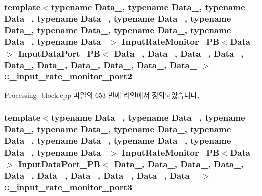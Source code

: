 \subsubsection[{\texorpdfstring{\+\_\+input\+\_\+rate\+\_\+monitor\+\_\+port2}{_input_rate_monitor_port2}}]{\setlength{\rightskip}{0pt plus 5cm}template$<$typename Data\+\_, typename Data\+\_, typename Data\+\_, typename Data\+\_, typename Data\+\_, typename Data\+\_, typename Data\+\_, typename Data\+\_, typename Data\+\_, typename Data\+\_$>$ {\bf Input\+Rate\+Monitor\+\_\+\+PB}$<$Data\+\_$>$ {\bf Input\+Data\+Port\+\_\+\+PB}$<$ Data\+\_, Data\+\_, Data\+\_, Data\+\_, Data\+\_, Data\+\_, Data\+\_, Data\+\_, Data\+\_, Data\+\_ $>$\+::\+\_\+input\+\_\+rate\+\_\+monitor\+\_\+port2\hspace{0.3cm}{\ttfamily [private]}}\hypertarget{classInputDataPort__PB_a9e3ee67f17eac2124e134f683292dfc5}{}\label{classInputDataPort__PB_a9e3ee67f17eac2124e134f683292dfc5}


Processing\+\_\+block.\+cpp 파일의 653 번째 라인에서 정의되었습니다.

\subsubsection[{\texorpdfstring{\+\_\+input\+\_\+rate\+\_\+monitor\+\_\+port3}{_input_rate_monitor_port3}}]{\setlength{\rightskip}{0pt plus 5cm}template$<$typename Data\+\_, typename Data\+\_, typename Data\+\_, typename Data\+\_, typename Data\+\_, typename Data\+\_, typename Data\+\_, typename Data\+\_, typename Data\+\_, typename Data\+\_$>$ {\bf Input\+Rate\+Monitor\+\_\+\+PB}$<$Data\+\_$>$ {\bf Input\+Data\+Port\+\_\+\+PB}$<$ Data\+\_, Data\+\_, Data\+\_, Data\+\_, Data\+\_, Data\+\_, Data\+\_, Data\+\_, Data\+\_, Data\+\_ $>$\+::\+\_\+input\+\_\+rate\+\_\+monitor\+\_\+port3\hspace{0.3cm}{\ttfamily [private]}}\hypertarget{classInputDataPort__PB_aaff08d79fb2328974a0da28ceca55233}{}\label{classInputDataPort__PB_aaff08d79fb2328974a0da28ceca55233}


